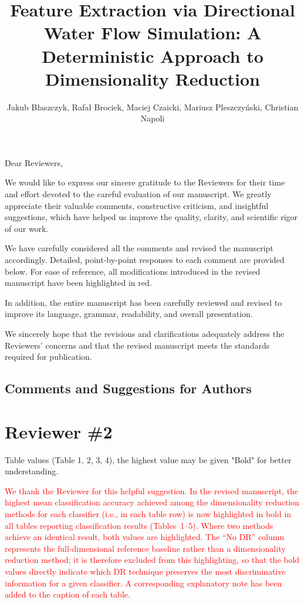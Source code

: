 \documentclass{ar2rc}
\title{Feature Extraction via Directional Water Flow Simulation: A Deterministic Approach to Dimensionality Reduction}
\author{Jakub Błaszczyk, Rafa{\l} Brociek, Maciej Czaicki, Mariusz Pleszczyński, Christian Napoli}
\begin{document}
\maketitle



Dear Reviewers,

We would like to express our sincere gratitude to the Reviewers for their time and effort devoted to the careful evaluation of our manuscript. We greatly appreciate their valuable comments, constructive criticism, and insightful suggestions, which have helped us improve the quality, clarity, and scientific rigor of our work.

We have carefully considered all the comments and revised the manuscript accordingly. Detailed, point-by-point responses to each comment are provided below. For ease of reference, all modifications introduced in the revised manuscript have been highlighted in red.

In addition, the entire manuscript has been carefully reviewed and revised to improve its language, grammar, readability, and overall presentation.

We sincerely hope that the revisions and clarifications adequately address the Reviewers' concerns and that the revised manuscript meets the standards required for publication.

\subsection*{Comments and Suggestions for Authors}

\section*{Reviewer \#2}

\RC %
Table values (Table 1, 2, 3, 4), the highest value may be given "Bold" for better understanding.

\AR
\textcolor{red}{We thank the Reviewer for this helpful suggestion. In the revised manuscript, the highest mean classification accuracy achieved among the dimensionality reduction methods for each classifier (i.e., in each table row) is now highlighted in bold in all tables reporting classification results (Tables~1--5). Where two methods achieve an identical result, both values are highlighted. The ``No DR'' column represents the full-dimensional reference baseline rather than a dimensionality reduction method; it is therefore excluded from this highlighting, so that the bold values directly indicate which DR technique preserves the most discriminative information for a given classifier. A corresponding explanatory note has been added to the caption of each table.}
\end{document}
